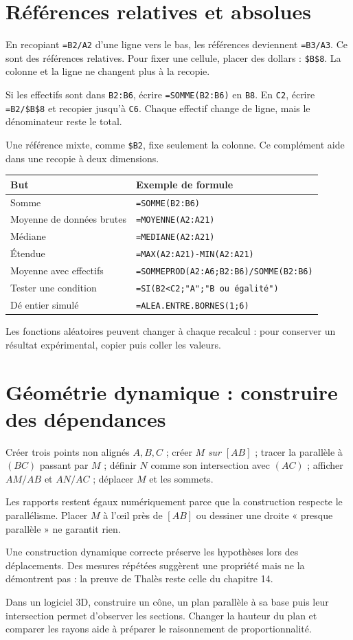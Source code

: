 \documentclass[../cours_3e.tex]{subfiles}
\begin{document}
\section{Références relatives et absolues}
En recopiant \texttt{=B2/A2} d'une ligne vers le bas, les références deviennent \texttt{=B3/A3}. Ce sont des références relatives.
Pour fixer une cellule, placer des dollars : \texttt{\$B\$8}. La colonne et la ligne ne changent plus à la recopie.
\begin{exemple}[Fréquences]
Si les effectifs sont dans \texttt{B2:B6}, écrire \texttt{=SOMME(B2:B6)} en \texttt{B8}. En \texttt{C2}, écrire \texttt{=B2/\$B\$8} et recopier jusqu'à \texttt{C6}. Chaque effectif change de ligne, mais le dénominateur reste le total.
\end{exemple}
Une référence mixte, comme \texttt{\$B2}, fixe seulement la colonne. Ce complément aide dans une recopie à deux dimensions.
\begin{center}
\begin{tabularx}{\textwidth}{lX}
\toprule But & Exemple de formule\\\midrule
Somme & \texttt{=SOMME(B2:B6)}\\
Moyenne de données brutes & \texttt{=MOYENNE(A2:A21)}\\
Médiane & \texttt{=MEDIANE(A2:A21)}\\
Étendue & \texttt{=MAX(A2:A21)-MIN(A2:A21)}\\
Moyenne avec effectifs & \texttt{=SOMMEPROD(A2:A6;B2:B6)/SOMME(B2:B6)}\\
Tester une condition & \texttt{=SI(B2<C2;"A";"B ou égalité")}\\
Dé entier simulé & \texttt{=ALEA.ENTRE.BORNES(1;6)}\\\bottomrule
\end{tabularx}
\end{center}
Les fonctions aléatoires peuvent changer à chaque recalcul : pour conserver un résultat expérimental, copier puis coller les valeurs.
\section{Géométrie dynamique : construire des dépendances}
\begin{methode}
Créer trois points non alignés $A,B,C$ ; créer $M$ \emph{sur} $[AB]$ ; tracer la parallèle à $(BC)$ passant par $M$ ; définir $N$ comme son intersection avec $(AC)$ ; afficher $AM/AB$ et $AN/AC$ ; déplacer $M$ et les sommets.
\end{methode}
Les rapports restent égaux numériquement parce que la construction respecte le parallélisme. Placer $M$ à l'œil près de $[AB]$ ou dessiner une droite « presque parallèle » ne garantit rien.
\begin{attention}
Une construction dynamique correcte préserve les hypothèses lors des déplacements. Des mesures répétées suggèrent une propriété mais ne la démontrent pas : la preuve de Thalès reste celle du chapitre 14.
\end{attention}
Dans un logiciel 3D, construire un cône, un plan parallèle à sa base puis leur intersection permet d'observer les sections. Changer la hauteur du plan et comparer les rayons aide à préparer le raisonnement de proportionnalité.
\end{document}
